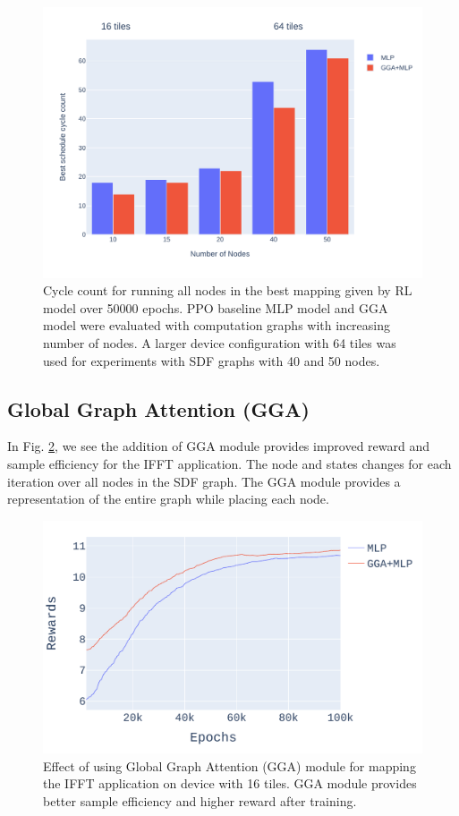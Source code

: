 \begin{figure}[h]
  \centering
  \includegraphics[width=\linewidth]{fig/nodes_graph.pdf}
  \caption{Cycle count for running all nodes in the best mapping given by RL model over 50000 epochs. 
  PPO baseline MLP model and GGA model were evaluated with computation graphs with increasing number of nodes. 
  A larger device configuration with 64 tiles was used for experiments with SDF graphs with 40 and 50 nodes. }
  \label{fig:nodes_graph}
\end{figure}


\subsection{Global Graph Attention (GGA)} \label{sec:GGA_result}

In Fig. \ref{fig:ifft_rewards}, we see the addition of GGA module provides improved reward and sample efficiency for the IFFT application. 
The node and states changes for each iteration over all nodes in the SDF graph. The GGA module provides a representation of the entire graph while placing each node.

\begin{figure}[h]
  \centering
  \includegraphics[width=\linewidth]{fig/plot_gnn_atten_ppo.pdf}
  \caption{Effect of using Global Graph Attention (GGA) module for mapping the IFFT application on device with 16 tiles. 
  GGA module provides better sample efficiency and higher reward after training. }
  \label{fig:ifft_rewards}
\end{figure}


